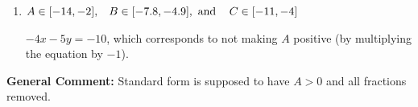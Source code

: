 \documentclass{extbook}[14pt]
\begin{document}
\begin{enumerate}
{\begin{enumerate}[label=\Alph*.]
* $4x + 5y = 10$, which is the correct option.
\item \( A \in [-14, -2], \hspace{3mm} B \in [-7.8, -4.9], \text{ and } \hspace{3mm} C \in [-11, -4] \)

 $-4x - 5y = -10$, which corresponds to not making $A$ positive (by multiplying the equation by $-1$).
\end{enumerate}

\textbf{General Comment:} Standard form is supposed to have $A > 0$ and all fractions removed.
}
\end{enumerate}
\end{document}
